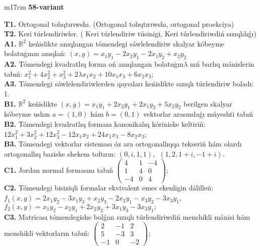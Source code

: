 \documentclass{article}
\begin{document}
\begin{tabular}{m{17cm}}
\textbf{58-variant}
\newline

\textbf{T1.} Ortogonal  tolıqtırıwshı. (Ortogonal tolıqtırıwshı,  ortogonal proekciya) \\
\textbf{T2.} Keri túrlendiriwler. ( Keri túrlendiriw túsinigi,   Keri túrlendiriwdiń sızıqlılıǵı) \\
\textbf{A1.} \(\mathbb{R}^{2}\) keńislikte anıqlangan tómendegi sáwlelendiriw skalyar kóbeyme bolatuģının anıqlań: \((x,y) = x_{1}y_{1} - 2x_{2}y_{1} - 2x_{1}y_{2} + x_{2}y_{2}\) \\
\textbf{A2.} Tómendegi kvadratlıq forma oń anıqlangan bolatuģın\(\lambda\) nıń barlıq mánislerin tabıń: \(x_{1}^{2} + 4x_{2}^{2} + x_{3}^{2} + 2\lambda x_{1}x_{2} + 10x_{1}x_{3} + 6x_{2}x_{3}\); \\
\textbf{A3.} Tómendegi sáwlelendiriwlerden qaysıları keńislikte sızıqlı túrlendiriw boladı: 1. \\
\textbf{B1.} \(\mathbb{R}^{2}\) keńislikte \((x,y) = x_{1}y_{1} + 2x_{2}y_{1} + 2x_{1}y_{2} + 5x_{2}y_{2}\) berilgen skalyar kóbeyme ushın \(a = (1,0)\) hám \(b = (0,1)\) vektorlar arasındaǵı múyeshti tabıń \\
\textbf{B2.} Tómendegi kvadratlıq formanı kanonikalıq kóriniske keltiriń: \(12x_{1}^{2} + 3x_{2}^{2} + 12x_{3}^{2} - 12x_{1}x_{2} + 24x_{1}x_{3} - 8x_{2}x_{3}\); \\
\textbf{B3.} Tómendegi vektorlar sisteması óz ara ortogonallıqqa tekseriń hám olardı ortogonallıq baziske shekem toltırın: \((0,i,1,1),\ \ (1,2,1 + i, - 1 + i)\). \\
\textbf{C1.} Jordan normal formasını tabıń \(\begin{pmatrix} 4 & 1 & - 4 \\ 1 & 4 & 0 \\  - 4 & 0 & 4 \end{pmatrix}\); \\
\textbf{C2.} Tómendegi bisiziqli formalar ekvivalent emes ekenligin dálilleń:\(f_{1}(x,y) = 2x_{1}y_{2} - 3x_{1}y_{3} + x_{2}y_{3} - 2x_{2}y_{1} - x_{3}y_{2} - 3x_{3}y_{1}\),\(f_{2}(x,y) = x_{1}y_{2} - x_{2}y_{1} + 2x_{2}y_{2} + 3x_{1}y_{3} - 3x_{3}y_{1};\) \\
\textbf{C3.} Matricası tómendegishe bolǵan sızıqlı túrlendiriwdiń menshikli mánisi hám menshikli vektorların tabıń: \(\begin{pmatrix} 2 & - 1 & 2 \\ 5 & - 3 & 3 \\  - 1 & 0 & - 2 \end{pmatrix}\); \\

\end{tabular}
\vspace{1cm}
\end{document}
